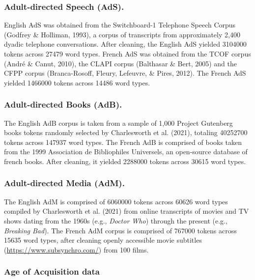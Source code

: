 \documentclass[10pt, letterpaper]{article}
\begin{document}
\hypertarget{adult-directed-speech-ads.}{%
\subsubsection{Adult-directed Speech
(AdS).}\label{adult-directed-speech-ads.}}

English AdS was obtained from the Switchboard-1 Telephone Speech Corpus
(Godfrey \& Holliman, 1993), a corpus of transcripts from approximately
2,400 dyadic telephone conversations. After cleaning, the English AdS
yielded 3104000 tokens across 27479 word types. French AdS was obtained
from the TCOF corpus (André \& Canut, 2010), the CLAPI corpus (Balthasar
\& Bert, 2005) and the CFPP corpus (Branca-Rosoff, Fleury, Lefeuvre, \&
Pires, 2012). The French AdS yielded 1466000 tokens across 14486 word
types.

\hypertarget{adult-directed-books-adb.}{%
\subsubsection{Adult-directed Books
(AdB).}\label{adult-directed-books-adb.}}

The English AdB corpus is taken from a sample of 1,000 Project Gutenberg
books tokens randomly selected by Charlesworth et al. (2021), totaling
40252700 tokens across 147937 word types. The French AdB is comprised of
books taken from the 1999 Association de Bibliophiles Universels, an
open-source database of french books. After cleaning, it yielded 2288000
tokens across 30615 word types.

\hypertarget{adult-directed-media-adm.}{%
\subsubsection{Adult-directed Media
(AdM).}\label{adult-directed-media-adm.}}

The English AdM is comprised of 6060000 tokens across 60626 word types
compiled by Charlesworth et al. (2021) from online transcripts of movies
and TV shows dating from the 1960s (e.g., \emph{Doctor Who}) through the
present (e.g., \emph{Breaking Bad}). The French AdM corpus is comprised
of 767000 tokens across 15635 word types, after cleaning openly
accessible movie subtitles (\url{https://www.subsynchro.com/}) from 100
films.

\hypertarget{age-of-acquisition-data}{%
\subsubsection{Age of Acquisition data}\label{age-of-acquisition-data}}
\end{document}
